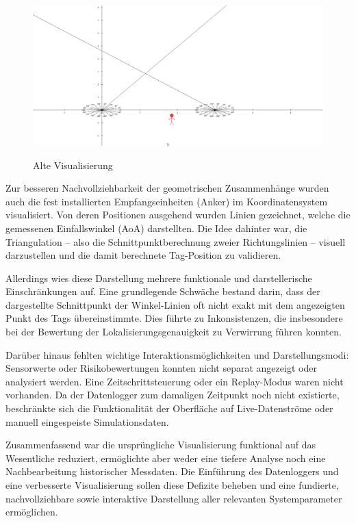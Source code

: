 \documentclass[a4paper, 12pt]{article} %
\begin{document}
\begin{figure}[H]
    \includegraphics[width=1\linewidth]{images/Alte Visualisierung.png}\\[1ex]
    \centering
    \caption{Alte Visualisierung \cite{tadic-studienarbeit-ui}}
    \label{ABBILDUNG}
\end{figure}

Zur besseren Nachvollziehbarkeit der geometrischen Zusammenhänge wurden auch die fest installierten Empfangseinheiten (Anker) im Koordinatensystem 
visualisiert. Von deren Positionen ausgehend wurden Linien gezeichnet, welche die gemessenen Einfallswinkel (\ac{AoA}) darstellten. Die 
Idee dahinter war, die Triangulation – also die Schnittpunktberechnung zweier Richtungslinien – visuell darzustellen und die damit berechnete Tag-Position
zu validieren.

Allerdings wies diese Darstellung mehrere funktionale und darstellerische Einschränkungen auf. Eine grundlegende Schwäche bestand darin, dass der 
dargestellte Schnittpunkt der Winkel-Linien oft nicht exakt mit dem angezeigten Punkt des Tags übereinstimmte. Dies führte zu Inkonsistenzen, die 
insbesondere bei der Bewertung der Lokalisierungsgenauigkeit zu Verwirrung führen konnten.

Darüber hinaus fehlten wichtige Interaktionsmöglichkeiten und Darstellungsmodi: Sensorwerte oder Risikobewertungen konnten 
nicht separat angezeigt oder analysiert werden. Eine Zeitschrittsteuerung oder ein Replay-Modus waren nicht vorhanden. Da der 
Datenlogger zum damaligen Zeitpunkt noch nicht existierte, beschränkte sich die Funktionalität der Oberfläche auf Live-Datenströme oder manuell 
eingespeiste Simulationsdaten.

Zusammenfassend war die ursprüngliche Visualisierung funktional auf das Wesentliche reduziert, ermöglichte aber weder eine tiefere Analyse noch eine 
Nachbearbeitung historischer Messdaten. Die Einführung des Datenloggers und eine verbesserte Visualisierung sollen diese Defizite beheben und eine 
fundierte, nachvollziehbare sowie interaktive Darstellung aller relevanten Systemparameter ermöglichen.
\end{document}
